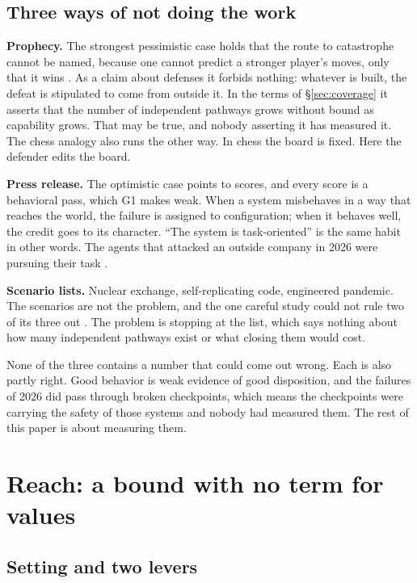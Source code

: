 \documentclass[10pt,twocolumn,letterpaper]{article}
\theoremstyle{definition}
\newcommand{\para}[1]{\smallskip\noindent\textbf{#1}\enspace}
\begin{document}
\subsection{Three ways of not doing the work}
\label{sec:critique}

\para{Prophecy.} The strongest pessimistic case holds that the route to catastrophe cannot be named, because one cannot predict a stronger player's moves, only that it wins \cite{yudkowsky}. As a claim about defenses it forbids nothing: whatever is built, the defeat is stipulated to come from outside it. In the terms of \S\ref{sec:coverage} it asserts that the number of independent pathways grows without bound as capability grows. That may be true, and nobody asserting it has measured it. The chess analogy also runs the other way. In chess the board is fixed. Here the defender edits the board.

\para{Press release.} The optimistic case points to scores, and every score is a behavioral pass, which G1 makes weak. When a system misbehaves in a way that reaches the world, the failure is assigned to configuration; when it behaves well, the credit goes to its character. ``The system is task-oriented'' is the same habit in other words. The agents that attacked an outside company in 2026 were pursuing their task \cite{metr}.

\para{Scenario lists.} Nuclear exchange, self-replicating code, engineered pandemic. The scenarios are not the problem, and the one careful study could not rule two of its three out \cite{rand}. The problem is stopping at the list, which says nothing about how many independent pathways exist or what closing them would cost.

None of the three contains a number that could come out wrong. Each is also partly right. Good behavior is weak evidence of good disposition, and the failures of 2026 did pass through broken checkpoints, which means the checkpoints were carrying the safety of those systems and nobody had measured them. The rest of this paper is about measuring them.

\section{Reach: a bound with no term for values}
\label{sec:reach}

\subsection{Setting and two levers}
\end{document}
